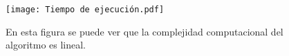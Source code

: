 \begin{figure}
    \centering
    \texttt{[image: Tiempo de ejecución.pdf]}
    \caption{En esta figura se puede ver que la complejidad computacional del algoritmo es lineal.}
    \label{fig:tiempo_de_ejecucion}
\end{figure}




\begin{comment}


\begin{figure}
    \centering
    \texttt{[image: convergencia.pdf]}
    \caption{En esta figura se puede observar como al aumentar el número de puntos por loops se reduce el error sistematico debido a la discretización de los loops.}
    \label{fig:convergencia_loops}
\end{figure}


\begin{table}
\begin{center}
 \begin{tabular}{|| c c c||} 
 \hline \\ 
 num. loops & N & $\frac{ \Delta F}{F}$ \\ [0.5ex] 
 \hline\hline
  10.000 & 10.000& 0.013 \\ 
 \hline
  1.000 & 10.000 & 0.024 \\
 \hline
  100 & 10.000 & 0.037\\
 \hline
  10.000 & 1.000 & 0.05 \\
 \hline
  1.000 & 1.000 & 0.058 \\ 
 \hline
   100 & 1.000 & 0.10 \\
 \hline
  10.000 & 1000 & 0.17\\
 \hline
  1.000 & 100 & 0.18 \\
 \hline
   100 & 100 & 0.20 \\ [1ex] 
 \hline
\end{tabular}
\end{center}
\caption{En esta tabla se puede ver como al aumentar el numero de loops y el número de puntos intermedios, el cálculo converge al resultado teórico.}
\label{table:1}
\end{table}
\end{comment}


